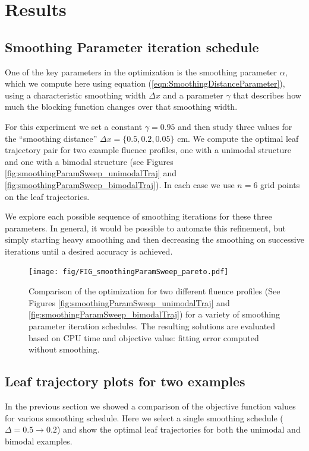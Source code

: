 \documentclass{iopart}
\begin{document}
\section{Results}

\subsection{Smoothing Parameter iteration schedule}

One of the key parameters in the optimization is the smoothing parameter $\alpha$, which we compute here using equation (\ref{eqn:SmoothingDistanceParameter}), using a characteristic smoothing width $\Delta x$ and a parameter $\gamma$ that describes how much the blocking function changes over that smoothing width. 

For this experiment we set a constant $\gamma = 0.95$ and then study three values for the ``smoothing distance'' $\Delta x = \{0.5, 0.2, 0.05\}$ cm. We compute the optimal leaf trajectory pair for two example fluence profiles, one with a unimodal structure and one with a bimodal structure (see Figures \ref{fig:smoothingParamSweep_unimodalTraj} and \ref{fig:smoothingParamSweep_bimodalTraj}). In each case we use $n=6$ grid points on the leaf trajectories.

We explore each possible sequence of smoothing iterations for these three parameters. In general, it would be possible to automate this refinement, but simply starting heavy smoothing and then decreasing the smoothing on successive iterations until a desired accuracy is achieved.

\begin{figure}
  \centering
  \texttt{[image: fig/FIG\_smoothingParamSweep\_pareto.pdf]}
  \caption{Comparison of the optimization for two different fluence profiles (See Figures \ref{fig:smoothingParamSweep_unimodalTraj} and \ref{fig:smoothingParamSweep_bimodalTraj}) for a variety of smoothing parameter iteration schedules. The resulting solutions are evaluated based on CPU time and objective value: fitting error computed without smoothing.}
  \label{fig:smoothingParamSweep_pareto}
\end{figure}


\subsection{Leaf trajectory plots for two examples}

In the previous section we showed a comparison of the objective function values for various smoothing schedule. Here we select a single smoothing schedule ($\Delta = 0.5 \to 0.2$) and show the optimal leaf trajectories for both the unimodal and bimodal examples.
\end{document}
